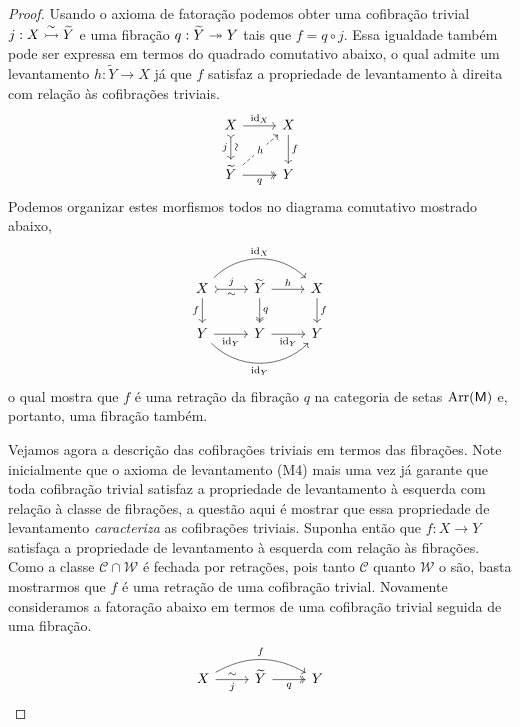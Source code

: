 \begin{proof}
  Usando o axioma de fatoração podemos obter uma cofibração trivial $j: X \overset{\sim}{\rightarrowtail} \widetilde{Y}$ e uma fibração $q: \widetilde{Y} \twoheadrightarrow Y$ tais que $f = q \circ j$.
  Essa igualdade também pode ser expressa em termos do quadrado comutativo abaixo, o qual admite um levantamento $h: \widetilde{Y} \to X$ já que $f$ satisfaz a propriedade de levantamento à direita com relação às cofibrações triviais.
  \begin{displaymath}
    \begin{tikzcd}
      X
      \arrow[r, "\id_{X}"]
      \arrow[d, tail, "j" {swap}, "\sim" {sloped}]
      & X
      \arrow[d, "f"]
      \\ \widetilde{Y}
      \arrow[r, two heads, "q" swap]
      \arrow[ru, dashed, "h" description]
      & Y
    \end{tikzcd}
  \end{displaymath}
  Podemos organizar estes morfismos todos no diagrama comutativo mostrado abaixo,
  \begin{displaymath}
    \begin{tikzcd}
      X
      \arrow[r, tail, "j", "\sim" {swap}]
      \arrow[d, "f" swap]
      \arrow[rr, bend left=45, "\id_{X}"]
      & \widetilde{Y}
      \arrow[r, "h"]
      \arrow[d, two heads, "q"]
      & X
      \arrow[d, "f"]
      \\ Y
      \arrow[r, "\id_{Y}" swap]
      \arrow[rr, bend right=45, "\id_{Y}" swap]
      & Y
      \arrow[r, "\id_{Y}" swap]
      & Y
    \end{tikzcd}
  \end{displaymath}
  o qual mostra que $f$ é uma retração da fibração $q$ na categoria de setas $\mathrm{Arr}(\mathsf{M})$ e, portanto, uma fibração também.

  Vejamos agora a descrição das cofibrações triviais em termos das fibrações.
  Note inicialmente que o axioma de levantamento (M4) mais uma vez já garante que toda cofibração trivial satisfaz a propriedade de levantamento à esquerda com relação à classe de fibrações, a questão aqui é mostrar que essa propriedade de levantamento \emph{caracteriza} as cofibrações triviais.
  Suponha então que $f: X \to Y$ satisfaça a propriedade de levantamento à esquerda com relação às fibrações.
  Como a classe $\mathcal{C} \cap \mathcal{W}$ é fechada por retrações, pois tanto $\mathcal{C}$ quanto $\mathcal{W}$ o são, basta mostrarmos que $f$ é uma retração de uma cofibração trivial.
  Novamente consideramos a fatoração abaixo em termos de uma cofibração trivial seguida de uma fibração.
  \begin{displaymath}
    \begin{tikzcd}
      X
      \arrow[r, "j" {swap}, "\sim"]
      \arrow[rr, bend left=30, "f"]
      & \widetilde{Y}
      \arrow[r, two heads, "q" swap]
      & Y
    \end{tikzcd}
  \end{displaymath}


\end{proof}
